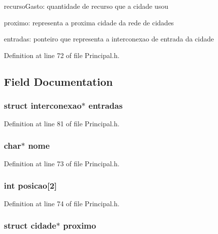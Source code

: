 recurso\-Gasto\-: quantidade de recurso que a cidade usou

proximo\-: representa a proxima cidade da rede de cidades

entradas\-: ponteiro que representa a interconexao de entrada da cidade 

Definition at line 72 of file Principal.\-h.



\subsection{Field Documentation}
\hypertarget{structcidade_ae28777a0a252764c89fe126c8d7fba4a}{
\subsubsection[{entradas}]{\setlength{\rightskip}{0pt plus 5cm}struct {\bf interconexao}$\ast$ entradas}}\label{structcidade_ae28777a0a252764c89fe126c8d7fba4a}


Definition at line 81 of file Principal.\-h.

\hypertarget{structcidade_ae2a0f66178bb1c4d42e2b70ec9426ccb}{
\subsubsection[{nome}]{\setlength{\rightskip}{0pt plus 5cm}char$\ast$ nome}}\label{structcidade_ae2a0f66178bb1c4d42e2b70ec9426ccb}


Definition at line 73 of file Principal.\-h.

\hypertarget{structcidade_a7e30d633898517077a4363ad6fade5b6}{
\subsubsection[{posicao}]{\setlength{\rightskip}{0pt plus 5cm}int posicao\mbox{[}2\mbox{]}}}\label{structcidade_a7e30d633898517077a4363ad6fade5b6}


Definition at line 74 of file Principal.\-h.

\hypertarget{structcidade_ac7a8c5f5dbf854099849bd3d9ab51517}{
\subsubsection[{proximo}]{\setlength{\rightskip}{0pt plus 5cm}struct {\bf cidade}$\ast$ proximo}}\label{structcidade_ac7a8c5f5dbf854099849bd3d9ab51517}


